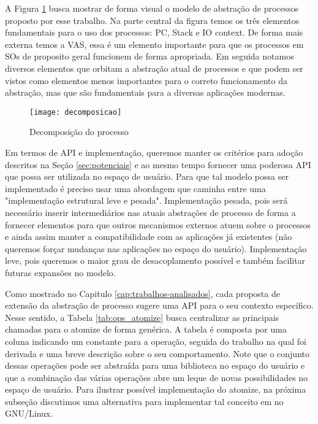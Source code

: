 

A Figura \ref{fig:decomposicao_proc} busca mostrar de forma visual o modelo de
abstração de processos proposto por esse trabalho. Na parte central da figura
temos os três elementos fundamentais para o uso dos processos: PC, Stack e IO
context. De forma mais externa temos a VAS, essa é um elemento importante para
que os processos em SOs de proposito geral funcionem de forma apropriada. Em
seguida notamos diversos elementos que orbitam a abstração atual de processos e
que podem ser vistos como elementos menos importantes para o correto
funcionamento da abstração, mas que são fundamentais para a diversas aplicações
modernas.

\begin{figure}[!h]
  \centering
  \texttt{[image: decomposicao]}
  \caption{Decomposição do processo}
  \label{fig:decomposicao_proc}
\end{figure}

Em termos de API e implementação, queremos manter os critérios para adoção
descritos na Seção \ref{sec:potenciais} e ao mesmo tempo fornecer uma poderosa
API que possa ser utilizada no espaço de usuário. Para que tal modelo possa ser
implementado é preciso usar uma abordagem que caminha entre uma "implementação
estrutural leve e pesada". Implementação pesada, pois será necessário inserir
intermediários nas atuais abstrações de processo de forma a fornecer elementos
para que outros mecanismos externos atuem sobre o processos e ainda assim
manter a compatibilidade com as aplicações já existentes (não queremos forçar
mudanças nas aplicações no espaço do usuário). Implementação leve, pois
queremos o maior grau de desacoplamento possível e também facilitar futuras
expansões no modelo.



Como mostrado no Capitulo \ref{cap:trabalhos-analisados}, cada proposta de
extensão da abstração de processo sugere uma API para o seu contexto
específico. Nesse sentido, a Tabela \ref{tab:ops_atomize} busca centralizar as
principais chamadas para o atomize de forma genérica. A tabela é composta por
uma coluna indicando um constante para a operação, seguida do trabalho na qual
foi derivada e uma breve descrição sobre o seu comportamento. Note que o
conjunto dessas operações pode ser abstraída para uma biblioteca no espaço do
usuário e que a combinação das várias operações abre um leque de novas
possibilidades no espaço de usuário. Para ilustrar possível implementação do
atomize, na próxima subseção discutimos uma alternativa para implementar tal
conceito em no GNU/Linux.

